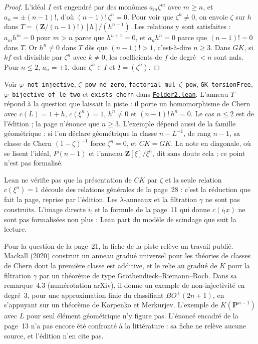 \begin{proof}
L'idéal $I$ est engendré par des monômes $a_m\zeta^m$ avec $m \geq n$, et $a_n = \pm(n-1)!$, d'où $(n-1)!\,\zeta^n = 0$. Pour voir que $\zeta^n \neq 0$, on envoie $\zeta$ sur $h$ dans $T = (\mathbf Z/(n-1)!)[h]/(h^{n+1})$. Les relations y sont satisfaites : $a_m h^m = 0$ pour $m > n$ parce que $h^{n+1} = 0$, et $a_n h^n = 0$ parce que $(n-1)! = 0$ dans $T$. Or $h^n \neq 0$ dans $T$ dès que $(n-1)! > 1$, c'est-à-dire $n \geq 3$. Dans $GK$, si $k f$ est divisible par $\zeta^n$ avec $k \neq 0$, les coefficients de $f$ de degré $< n$ sont nuls. Pour $n \leq 2$, $a_n = \pm 1$, donc $\zeta^n \in I$ et $I = (\zeta^n)$.
\end{proof}

{\sloppy \noindent Voir \texttt{$\varphi$\_not\_injective}, \texttt{$\zeta$\_pow\_ne\_zero}, \texttt{factorial\_mul\_$\zeta$\_pow}, \texttt{GK\_torsionFree}, \texttt{$\varphi$\_bijective\_of\_le\_two} et \texttt{exists\_chern} dans \href{\leanblob/AlgebraicGeometry/Folder2.lean}{\texttt{Folder2.\allowbreak{}lean}}. L'anneau $T$ répond à la question que laissait la piste : il porte un homomorphisme de Chern avec $c(L) = 1 + h$, $c(\xi^n) = 1$, $h^n \neq 0$ et $(n-1)!\,h^n = 0$. Le cas $n \leq 2$ est de l'édition ; la page n'énonce que $n \geq 3$. L'exemple dépend aussi de la famille géométrique : si l'on déclare géométrique la classe $n - L^{-1}$, de rang $n - 1$, sa classe de Chern $(1 - \zeta)^{-1}$ force $\zeta^n = 0$, et $CK = GK$. La note en diagonale, où se lisent l'idéal, $P(n-1)$ et l'anneau $\mathbf Z[\xi]/\xi^n$, dit sans doute cela ; ce point n'est pas formalisé.\par}

Lean ne vérifie pas que la présentation de $CK$ par $\zeta$ et la seule relation $c(\xi^n) = 1$ découle des relations générales de la page~28 : c'est la réduction que fait la page, reprise par l'édition. Les $\lambda$-anneaux et la filtration $\gamma$ ne sont pas construits. L'image directe $i_!$ et la formule de la page~11 qui donne $c(i_!x)$ ne sont pas formalisées non plus : Lean part du modèle de scindage que suit la lecture.

Pour la question de la page~21, la fiche de la piste relève un travail publié. Mackall (2020) \cite{mackall2020} construit un anneau gradué universel pour les théories de classes de Chern dont la première classe est additive, et le relie au gradué de $K$ pour la filtration $\gamma$ par un théorème de type Grothendieck--Riemann--Roch. Dans sa remarque~4.3 (numérotation arXiv), il donne un exemple de non-injectivité en degré~$3$, pour une approximation finie du classifiant $BO^+(2n+1)$, en s'appuyant sur un théorème de Karpenko et Merkurjev. L'exemple de $K(\mathbf P^{n-1})$ avec $L$ pour seul élément géométrique n'y figure pas. L'énoncé encadré de la page~13 n'a pas encore été confronté à la littérature : sa fiche ne relève aucune source, et l'édition n'en cite pas.
